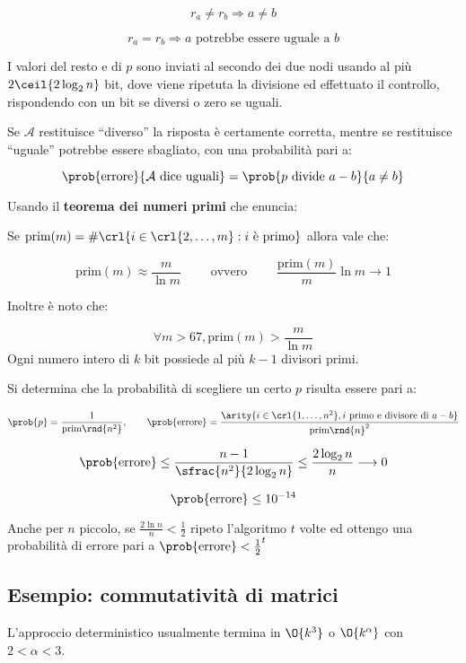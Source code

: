 \documentclass[\main/main.tex]{subfiles}
\begin{document}
\[
	r_a \neq r_b \Rightarrow a \neq b
\]

\[
	r_a = r_b \Rightarrow a \text{ potrebbe essere uguale a } b
\]

I valori del resto e di \(p\) sono inviati al secondo dei due nodi usando al più \(2\ceil{2\log_2{n}}\) bit, dove viene ripetuta la divisione ed effettuato il controllo, rispondendo con un bit se diversi o zero se uguali.

Se \(\mathcal{A}\) restituisce ``diverso'' la risposta è certamente corretta, mentre se restituisce ``uguale'' potrebbe essere sbagliato, con una probabilità pari a:

\[
	\prob{\text{errore}}{\mathcal{A}\text{ dice uguali}} = \prob{p \text{ divide }a-b}{a \neq b}
\]

Usando il \textbf{teorema dei numeri primi} che enuncia:

\begin{theorem}
	Se \(\text{prim}(m) = \#\crl{i \in \crl{2, \ldots, m}: i \text{ è primo}}\) allora vale che:

	\[
		\text{prim}(m) \approx \frac{m}{\ln m} \qquad \text{ ovvero } \qquad \frac{\text{prim}(m)}{m}\ln m \longrightarrow 1
	\]

	Inoltre è noto che:

	\[
		\forall m > 67, \text{prim}(m) > \frac{m}{\ln m}
	\]
	Ogni numero intero di \(k\) bit possiede al più \(k-1\) divisori primi.
\end{theorem}

Si determina che la probabilità di scegliere un certo \(p\) risulta essere pari a:

\[
	\prob{p} = \frac{1}{\text{prim}\rnd{n^2}}, \qquad \prob{\text{errore}} = \frac{\arity{i \in \crl{1, \ldots, n^2}, i \text{ primo e divisore di }a-b}}{\text{prim}\rnd{n}^2}
\]

\[
	\prob{\text{errore}} \leq \frac{n-1}{\sfrac{n^2}{2\log_2 n}} \leq \frac{2\log_2 n}{n} \longrightarrow 0
\]

\[
	\prob{\text{errore}} \leq 10^{-14}
\]

Anche per \(n\) piccolo, se \(\frac{2\ln n}{n} < \frac{1}{2}\) ripeto l'algoritmo \(t\) volte ed ottengo una probabilità di errore pari a \(\prob{\text{errore}} < \frac{1}{2}^t\)

\subsection{Esempio: commutatività di matrici}
L'approccio deterministico usualmente termina in \(\O{k^3}\) o \(\O{k^\alpha}\) con \(2 < \alpha < 3\).
\end{document}

